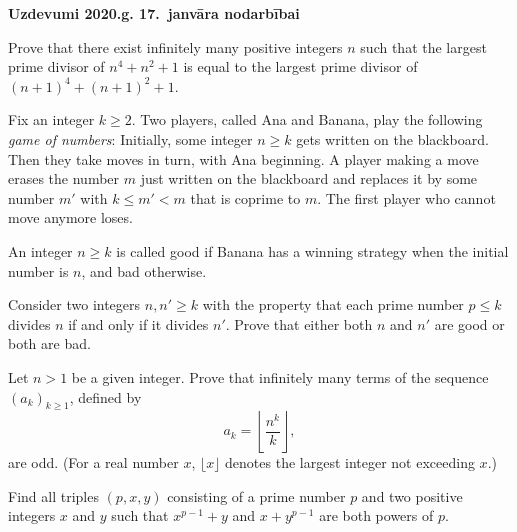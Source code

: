 \documentclass[11pt]{article}
\begin{document}
\begin{center}
{\Large \bf Uzdevumi 2020.g. 17.\ janvāra nodarbībai}
\end{center}

\vspace{10pt}

\begin{problem}
Prove that there exist infinitely many positive integers $n$ 
such that the largest prime divisor
of $n^4 + n^2 + 1$ is equal to the largest 
prime divisor of $(n+1)^4 + (n+1)^2 + 1$.
\end{problem}

\begin{problem}
Fix an integer $k \geq 2$. Two players, called Ana and Banana, 
play the following {\em game of
numbers}: Initially, some integer $n \geq k$ gets written 
on the blackboard. Then they take moves
in turn, with Ana beginning. A player making a move 
erases the number $m$ just written on the
blackboard and replaces it by some number $m'$ with 
$k \leq m' < m$ that is coprime to $m$. The first
player who cannot move anymore loses.

An integer $n \geq k$ is called good if Banana has a winning 
strategy when the initial number is $n$, and bad otherwise.

Consider two integers $n, n' \geq k$ with the property 
that each prime number $p \leq k$ divides $n$ if
and only if it divides $n'$.
Prove that either both $n$ and $n'$
are good or both are bad.
\end{problem}

\begin{problem}
Let $n > 1$ be a given integer. Prove that infinitely 
many terms of the sequence $\left( a_k \right)_{k \geq 1}$,
defined by
$$a_k = \left\lfloor \frac{n^k}{k} \right\rfloor,$$
are odd. (For a real number $x$, $\lfloor x \rfloor$ denotes 
the largest integer not exceeding $x$.)
\end{problem}

\begin{problem}
Find all triples $(p,x,y)$ consisting of a prime number $p$ 
and two positive integers $x$ and $y$
such that $x^{p-1} + y$  and $x + y^{p-1}$ are both powers of $p$.
\end{problem}
\end{document}
